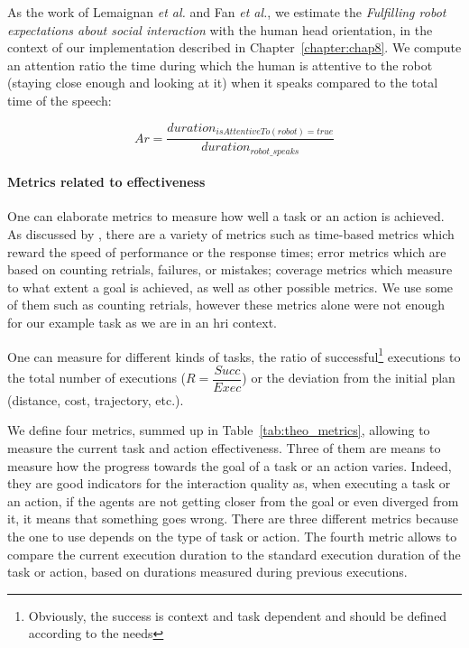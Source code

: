 \documentclass[a4paper,11pt,twoside]{StyleThese}
\begin{document}
As the work of Lemaignan \textit{et al.} and Fan \textit{et al.}, we estimate the \textit{Fulfilling robot expectations about social interaction} with the human head orientation, in the context of our implementation described in Chapter~\ref{chapter:chap8}. We compute an attention ratio \ie the time during which the human is attentive to the robot (\ie staying close enough and looking at it) when it speaks compared to the total time of the speech:

\begin{equation}\label{eq:attention_r}
Ar = \frac{duration_{isAttentiveTo(robot)=true}}{duration_{robot\_speaks}}
\end{equation}

\paragraph{Metrics related to effectiveness}\label{subsec:task_eff}
One can elaborate metrics to measure how well a task or an action is achieved. As discussed by \cite{olsen_2003_metrics}, there are a variety of metrics such as time-based metrics which reward the speed of performance or the response times; error metrics which are based on counting retrials, failures, or mistakes; coverage metrics which measure to what extent a goal is achieved, as well as other possible metrics. We use some of them such as counting retrials, however these metrics alone were not enough for our example task as we are in an \acrshort{hri} context.

One can measure for different kinds of tasks, the ratio of successful\footnote{Obviously, the success is context and task dependent and should be defined according to the needs} executions to the total number of executions (\eg $R=\dfrac{Succ}{Exec}$) or the deviation from the initial plan (distance, cost, trajectory, etc.). 

We define four metrics, summed up in Table~\ref{tab:theo_metrics}, allowing to measure the current task and action effectiveness. Three of them are means to measure how the progress towards the goal of a task or an action varies. Indeed, they are good indicators for the interaction quality as, when executing a task or an action, if the agents are not getting closer from the goal or even diverged from it, it means that something goes wrong. There are three different metrics because the one to use depends on the type of task or action. The fourth metric allows to compare the current execution duration to the standard execution duration of the task or action, based on durations measured during previous executions.
\end{document}
